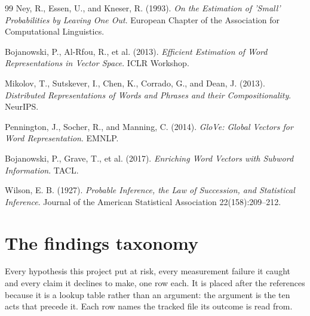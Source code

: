 \documentclass[11pt,a4paper]{article}
\begin{document}
\begin{thebibliography}{99}
Ney, R., Essen, U., and Kneser, R. (1993).
\emph{On the Estimation of 'Small' Probabilities by Leaving One Out}.
European Chapter of the Association for Computational Linguistics.

Bojanowski, P., Al-Rfou, R., et al. (2013).
\emph{Efficient Estimation of Word Representations in Vector Space}.
ICLR Workshop.

Mikolov, T., Sutskever, I., Chen, K., Corrado, G., and Dean, J. (2013).
\emph{Distributed Representations of Words and Phrases and their
Compositionality}. NeurIPS.

Pennington, J., Socher, R., and Manning, C. (2014).
\emph{GloVe: Global Vectors for Word Representation}. EMNLP.

Bojanowski, P., Grave, T., et al. (2017).
\emph{Enriching Word Vectors with Subword Information}. TACL.

Wilson, E. B. (1927).
\emph{Probable Inference, the Law of Succession, and Statistical Inference}.
Journal of the American Statistical Association 22(158):209--212.

\end{thebibliography}

\clearpage
\section*{The findings taxonomy}

Every hypothesis this project put at risk, every measurement failure it caught
and every claim it declines to make, one row each. It is placed after the
references because it is a lookup table rather than an argument: the argument
is the ten acts that precede it. Each row names the tracked file its outcome is
read from.


\end{document}
